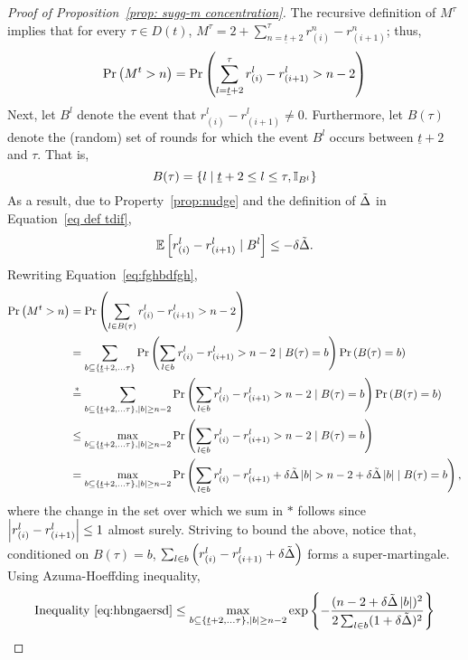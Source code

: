 \begin{proof}[Proof of Proposition~\ref{prop: sugg-m concentration}]
The recursive definition of $M^\tau$ implies that for every $\tau \in D(t)$, $M^\tau = 2+ \sum_{n= \underline{t}+2 }^{\tau} r^n_{(i)}-r^n_{(i+1)}$; thus, 
\begin{align}\label{eq:fghbdfgh}
\Pr\left( M^t > n \right)  = \Pr\left( \sum_{l= \underline{t}+2 }^{\tau} r^l_{(i)}-r^l_{(i+1)}> n-2 \right)
\end{align}
Next, let $B^l$ denote the event that $r^l_{(i)}-r^l_{(i+1)} \neq 0$. Furthermore, let $B(\tau)$ denote the (random) set of rounds for which the event $B^l$ occurs between $\underline{t}+2$ and $\tau$. That is,
\[
B(\tau) = \{ l\mid \underline{t}+2 \leq l \leq \tau, \mathbb{I}_{B^l} \}
\]
As a result, due to Property~\ref{prop:nudge} and the definition of $\tilde\Delta$ in Equation~\eqref{eq def tdif},
\begin{equation}\label{eq:sgdjfndb}
\mathbb{E}\left[ r^l_{(i)}-r^l_{(i+1)} \mid B^l \right] \leq - \delta \tilde\Delta.
\end{equation}
Rewriting Equation~\eqref{eq:fghbdfgh},
\begin{align}\label{eq:hbngaersd}
\Pr\left( M^t > n \right)  &= \Pr\left( \sum_{l \in B(\tau)} r^l_{(i)}-r^l_{(i+1)}> n-2 \right) \nonumber \\
& =\sum_{b\subseteq \{\underline{t}+2,\dots \tau \}}\Pr\left( \sum_{l \in b} r^l_{(i)}-r^l_{(i+1)}> n-2 \mid  B(\tau) = b \right)\Pr\left( B(\tau) = b \right) \nonumber\\
& \stackrel{*}{=} \sum_{b\subseteq \{\underline{t}+2,\dots \tau \}, \left\lvert b\right\rvert\geq n-2}\Pr\left( \sum_{l \in b} r^l_{(i)}-r^l_{(i+1)}> n-2 \mid  B(\tau) = b \right)\Pr\left( B(\tau) = b \right) \nonumber\\
& \leq \max_{b\subseteq \{\underline{t}+2,\dots \tau \}, \left\lvert b\right\rvert\geq n-2} \Pr\left( \sum_{l \in b} r^l_{(i)}-r^l_{(i+1)}> n-2 \mid  B(\tau) = b \right) \nonumber \\
& = \max_{b\subseteq \{\underline{t}+2,\dots \tau \}, \left\lvert b\right\rvert\geq n-2} \Pr\left( \sum_{l \in b} r^l_{(i)}-r^l_{(i+1)} + \delta \tilde\Delta \left\lvert b\right\rvert> n-2+\delta \tilde\Delta \left\lvert b\right\rvert \mid  B(\tau) = b \right),
\end{align}
where the change in the set over which we sum in $*$ follows since $\left\lvert r^l_{(i)}-r^l_{(i+1)}\right\rvert\leq 1$ almost surely. Striving to bound the above, notice that, conditioned on $B(\tau) = b$, $\sum_{l \in b} \left( r^l_{(i)}-r^l_{(i+1)} + \delta \tilde\Delta \right)$ forms a super-martingale. Using Azuma-Hoeffding inequality,
\begin{align*}
\textnormal{Inequality }\eqref{eq:hbngaersd} &\leq \max_{b\subseteq \{\underline{t}+2,\dots \tau \}, \abs{b}\geq n-2} \exp\left\{-\frac{(n-2+\delta \tdif \abs{b})^2}{2 \sum_{l\in b} (1+\delta \tdif)^2 }\right\} \nonumber \\

\end{align*}
\end{proof}
